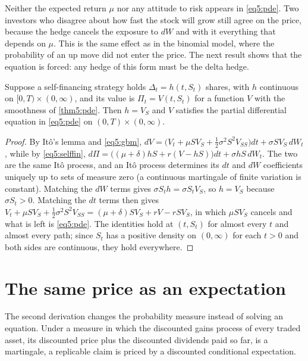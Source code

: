 \begin{chapterrefs}
Neither the expected return $\mu$ nor any attitude to risk appears in \cref{eq5:pde}. Two
investors who disagree about how fast the stock will grow still agree on the price, because the hedge
cancels the exposure to $dW$ and with it everything that depends on $\mu$. This is the same effect
as in the binomial model, where the probability of an up move did not enter the price. The next result
shows that the equation is forced: any hedge of this form must be the delta hedge.

\begin{proposition}\label{prop5:necessary}
Suppose a self-financing strategy holds $\Delta_t=h(t,S_t)$ shares, with $h$ continuous on
$[0,T)\times(0,\infty)$, and its value is $\Pi_t=V(t,S_t)$ for a function $V$ with the smoothness of
\cref{thm5:pde}. Then $h=V_S$ and $V$
satisfies the partial differential equation in \cref{eq5:pde} on $(0,T)\times(0,\infty)$.
\end{proposition}

\begin{proof}
By It\^o's lemma and \cref{eq5:gbm},
$dV=\bigl(V_t+\mu SV_S+\tfrac12\sigma^2S^2V_{SS}\bigr)dt+\sigma SV_S\,dW_t$, while by
\cref{eq5:selffin}, $d\Pi=\bigl((\mu+\delta)h S+r(V-hS)\bigr)dt+\sigma hS\,dW_t$. The two are the same It\^o
process, and an It\^o process determines its $dt$ and $dW$ coefficients uniquely up to sets of measure
zero (a continuous martingale of finite variation is constant). Matching the $dW$ terms gives
$\sigma S_th=\sigma S_tV_S$, so $h=V_S$ because $\sigma S_t>0$. Matching the $dt$ terms then gives
$V_t+\mu SV_S+\tfrac12\sigma^2S^2V_{SS}=(\mu+\delta)SV_S+rV-rSV_S$, in which $\mu SV_S$ cancels and what is
left is \cref{eq5:pde}. The identities hold at $(t,S_t)$ for almost every $t$ and almost every path;
since $S_t$ has a positive density on $(0,\infty)$ for each $t>0$ and both sides are continuous, they
hold everywhere.
\end{proof}

\section{The same price as an expectation}
\label{sec5:rn}

The second derivation changes the probability measure instead of solving an equation. Under a measure
in which the discounted gains process of every traded asset, its discounted price plus the discounted
dividends paid so far, is a martingale, a replicable claim is priced by a discounted conditional
expectation.


\end{chapterrefs}
